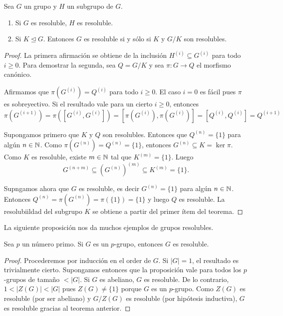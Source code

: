 \begin{theorem}
Sea $G$ un grupo y $H$ un subgrupo de $G$.
\begin{enumerate}
	\item Si $G$ es resoluble, $H$ es resoluble.
	\item Si $K\unlhd G$. Entonces $G$ es resoluble si y sólo si $K$ y $G/K$ son resolubles. 
\end{enumerate}	
\end{theorem}

\begin{proof}
La primera afirmación se obtiene de la inclusión $H^{(i)}\subseteq G^{(i)}$ para todo $i\geq0$. Para demostrar la segunda, sea $Q=G/K$ y sea
$\pi\colon G\to Q$ el morfismo canónico. 

Afirmamos que $\pi(G^{(i)})=Q^{(i)}$ para todo $i\geq 0$. El caso $i=0$ es fácil pues $\pi$ es sobreyectivo. Si el resultado vale para un cierto $i\geq0$, entonces
\[
\pi(G^{(i+1)})=\pi([G^{(i)},G^{(i)}])=[\pi(G^{(i)}),\pi(G^{(i)})]=[Q^{(i)},Q^{(i)}]=Q^{(i+1)}
\]

Supongamos primero que $K$ y $Q$ son resolubles. Entonces que $Q^{(n)}=\{1\}$ para algún $n\in\mathbb{N}$. Como $\pi(G^{(n)})=Q^{(n)}=\{1\}$, entonces $G^{(n)}\subseteq K=\ker\pi$. Como $K$ es resoluble, 
existe $m\in\mathbb{N}$ tal que $K^{(m)}=\{1\}$. Luego
\[
G^{(n+m)}\subseteq \left(G^{(n)}\right)^{(m)}\subseteq K^{(m)}=\{1\}.
\]

Supngamos ahora que $G$ es resoluble, es decir $G^{(n)}=\{1\}$ para algún $n\in\mathbb{N}$. Entonces $Q^{(n)}=\pi(G^{(n)})=\pi(\{1\})=\{1\}$ y luego $Q$ es resoluble. La resolubiildad 
del subgrupo $K$ se obtiene a partir del primer ítem del teorema.
\end{proof}

La siguiente proposición nos da muchos ejemplos de grupos resolubles.

\begin{proposition}
Sea $p$ un número primo. Si $G$ es un $p$-grupo, entonces $G$ es resoluble.
\end{proposition}

\begin{proof}
Procederemos por inducción en el order de $G$. Si $|G|=1$, el resultado es trivialmente cierto. Supongamos entonces que la proposición vale para todos los $p$-grupos de tamaño $<|G|$. Si $G$ es abeliano, $G$ es resoluble. De lo contrario, $1<|Z(G)|<|G|$ pues $Z(G)\ne\{1\}$ porque $G$ es un $p$-grupo. Como $Z(G)$ es resoluble (por ser abeliano) y $G/Z(G)$ es resoluble (por hipótesis inductiva), $G$ es resoluble gracias al teorema anterior. 
\end{proof}

